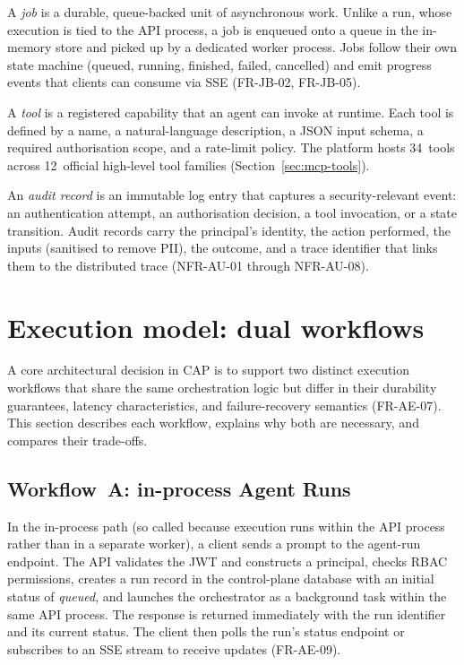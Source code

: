 \documentclass[a4paper,noexaminfo]{sapthesis}
\begin{document}
A \emph{job} is a durable, queue-backed unit of asynchronous work.  Unlike
a run, whose execution is tied to the API process, a job is enqueued onto
a queue in the in-memory store and picked up by a dedicated worker process.  Jobs follow
their own state machine (queued, running, finished, failed, cancelled) and
emit progress events that clients can consume via SSE (FR-JB-02, FR-JB-05).

A \emph{tool} is a registered capability that an agent can invoke at
runtime.  Each tool is defined by a name, a natural-language description, a
JSON input schema, a required authorisation scope, and a rate-limit policy.
The platform hosts 34~tools across 12~official high-level tool families
(Section~\ref{sec:mcp-tools}).

An \emph{audit record} is an immutable log entry that captures a
security-relevant event: an authentication attempt, an authorisation
decision, a tool invocation, or a state transition.  Audit records carry
the principal's identity, the action performed, the inputs (sanitised to
remove PII), the outcome, and a trace identifier that links them to the
distributed trace (NFR-AU-01 through NFR-AU-08).


\section{Execution model: dual workflows}
\label{sec:execution-model}

A core architectural decision in CAP is to support two distinct execution
workflows that share the same orchestration logic but differ in their
durability guarantees, latency characteristics, and failure-recovery
semantics (FR-AE-07).  This section describes each workflow, explains why
both are necessary, and compares their trade-offs.

\subsection{Workflow~A: in-process Agent Runs}

In the in-process path (so called because execution runs within the API
process rather than in a separate worker), a client sends a prompt to
the agent-run endpoint.
The API validates the JWT and constructs a principal, checks RBAC
permissions, creates a run record in the control-plane database with an
initial status of \emph{queued}, and launches the orchestrator as a
background task within the same API process.  The response is returned
immediately with the run identifier and its current status.
The client then polls the run's status endpoint or
subscribes to an SSE stream to receive updates (FR-AE-09).
\end{document}
